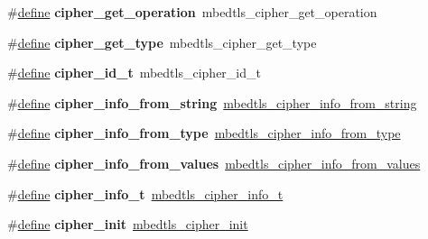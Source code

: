 \begin{DoxyCompactItemize}
\#\hyperlink{structdefine}{define} {\bfseries cipher\+\_\+get\+\_\+operation}~mbedtls\+\_\+cipher\+\_\+get\+\_\+operation
\item 
\mbox{\label{compat-1_83_8h_ac71941210d20fd930ce621a4534359a2}} 
\#\hyperlink{structdefine}{define} {\bfseries cipher\+\_\+get\+\_\+type}~mbedtls\+\_\+cipher\+\_\+get\+\_\+type
\item 
\mbox{\label{compat-1_83_8h_a6445ec56e80857f7c4cd65f8fd45c792}} 
\#\hyperlink{structdefine}{define} {\bfseries cipher\+\_\+id\+\_\+t}~mbedtls\+\_\+cipher\+\_\+id\+\_\+t
\item 
\mbox{\label{compat-1_83_8h_aef3b85d367d312cb50ee5d66eedb0907}} 
\#\hyperlink{structdefine}{define} {\bfseries cipher\+\_\+info\+\_\+from\+\_\+string}~\hyperlink{cipher_8h_a9b2e7d49ca82abe8c96b65645364e24b}{mbedtls\+\_\+cipher\+\_\+info\+\_\+from\+\_\+string}
\item 
\mbox{\label{compat-1_83_8h_a33168be23ce32dc82463cfa19672c8d6}} 
\#\hyperlink{structdefine}{define} {\bfseries cipher\+\_\+info\+\_\+from\+\_\+type}~\hyperlink{cipher_8h_a8bc2809cbd7c2357f41be8cf76eeed92}{mbedtls\+\_\+cipher\+\_\+info\+\_\+from\+\_\+type}
\item 
\mbox{\label{compat-1_83_8h_ace01f14173f326813e1441dc6b7aff64}} 
\#\hyperlink{structdefine}{define} {\bfseries cipher\+\_\+info\+\_\+from\+\_\+values}~\hyperlink{cipher_8h_a9752d8056c43948c08d2e1f2009a53aa}{mbedtls\+\_\+cipher\+\_\+info\+\_\+from\+\_\+values}
\item 
\mbox{\label{compat-1_83_8h_a210b7cc53c68e1419be4a9a957c93621}} 
\#\hyperlink{structdefine}{define} {\bfseries cipher\+\_\+info\+\_\+t}~\hyperlink{structmbedtls__cipher__info__t}{mbedtls\+\_\+cipher\+\_\+info\+\_\+t}
\item 
\mbox{\label{compat-1_83_8h_a4eae2e53780ff03c2da6859527440e21}} 
\#\hyperlink{structdefine}{define} {\bfseries cipher\+\_\+init}~\hyperlink{cipher_8h_a80354364e91cdb4d4e6ab7ecec65fe07}{mbedtls\+\_\+cipher\+\_\+init}
\item 
\mbox{\label{compat-1_83_8h_adc7705a423b2014936f0531110f20d2d}} 

\end{DoxyCompactItemize}
